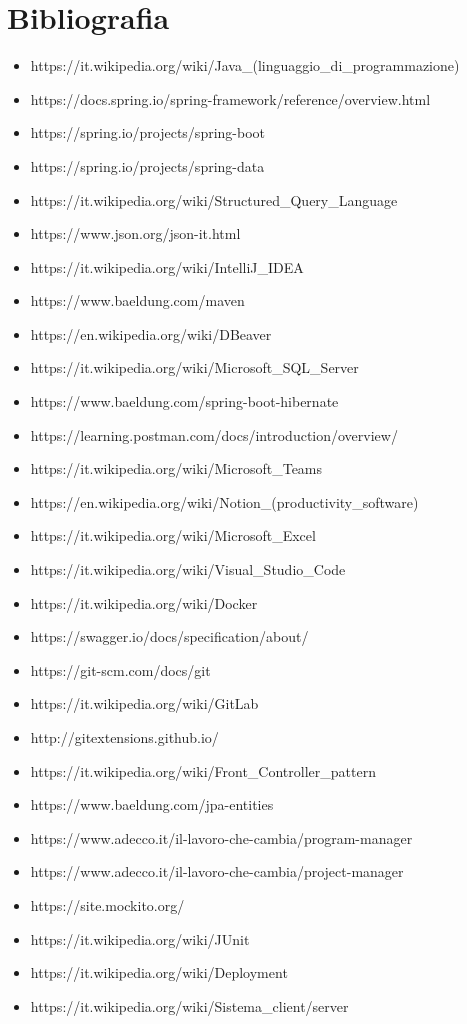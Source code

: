 \cleardoublepage
\chapter{Bibliografia}

\nocite{*}

\printbibliography[heading=subbibliography,title={Riferimenti bibliografici},type=book]

\printbibliography[heading=subbibliography,title={Siti web consultati},type=online]

\begin{itemize}
\item https://it.wikipedia.org/wiki/Java\_(linguaggio\_di\_programmazione)
\item https://docs.spring.io/spring-framework/reference/overview.html
\item https://spring.io/projects/spring-boot
\item https://spring.io/projects/spring-data
\item https://it.wikipedia.org/wiki/Structured\_Query\_Language
\item https://www.json.org/json-it.html
\item https://it.wikipedia.org/wiki/IntelliJ\_IDEA
\item https://www.baeldung.com/maven
\item https://en.wikipedia.org/wiki/DBeaver
\item https://it.wikipedia.org/wiki/Microsoft\_SQL\_Server
\item https://www.baeldung.com/spring-boot-hibernate
\item https://learning.postman.com/docs/introduction/overview/
\item https://it.wikipedia.org/wiki/Microsoft\_Teams
\item https://en.wikipedia.org/wiki/Notion\_(productivity\_software)
\item https://it.wikipedia.org/wiki/Microsoft\_Excel
\item https://it.wikipedia.org/wiki/Visual\_Studio\_Code
\item https://it.wikipedia.org/wiki/Docker
\item https://swagger.io/docs/specification/about/
\item https://git-scm.com/docs/git
\item https://it.wikipedia.org/wiki/GitLab
\item http://gitextensions.github.io/
\item https://it.wikipedia.org/wiki/Front\_Controller\_pattern
\item https://www.baeldung.com/jpa-entities
\item https://www.adecco.it/il-lavoro-che-cambia/program-manager
\item https://www.adecco.it/il-lavoro-che-cambia/project-manager
\item https://site.mockito.org/
\item https://it.wikipedia.org/wiki/JUnit
\item https://it.wikipedia.org/wiki/Deployment
\item https://it.wikipedia.org/wiki/Sistema\_client/server

\end{itemize}